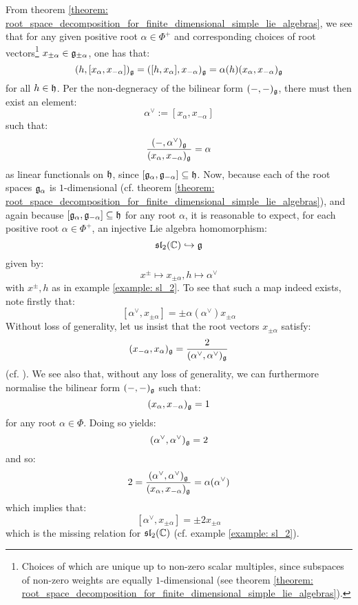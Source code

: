         From theorem \ref{theorem: root_space_decomposition_for_finite_dimensional_simple_lie_algebras}, we see that for any given positive root $\alpha \in \Phi^+$ and corresponding choices of root vectors\footnote{Choices of which are unique up to non-zero scalar multiples, since subspaces of non-zero weights are equally $1$-dimensional (see theorem \ref{theorem: root_space_decomposition_for_finite_dimensional_simple_lie_algebras}).} $x_{\pm\alpha} \in \mathfrak{g}_{\pm\alpha}$, one has that:
            $$(h, [x_{\alpha}, x_{-\alpha}])_{\mathfrak{g}} = ([h, x_{\alpha}], x_{-\alpha})_{\mathfrak{g}} = \alpha(h) (x_{\alpha}, x_{-\alpha})_{\mathfrak{g}}$$
        for all $h \in \mathfrak{h}$. Per the non-degneracy of the bilinear form $(-, -)_{\mathfrak{g}}$, there must then exist an element:
            $$\alpha^{\vee} := [x_{\alpha}, x_{-\alpha}]$$
        such that:
            $$\frac{(-, \alpha^{\vee})_{\mathfrak{g}}}{(x_{\alpha}, x_{-\alpha})_{\mathfrak{g}}} = \alpha$$
        as linear functionals on $\mathfrak{h}$, since $[\mathfrak{g}_{\alpha}, \mathfrak{g}_{-\alpha}] \subseteq \mathfrak{h}$. Now, because each of the root spaces $\mathfrak{g}_{\alpha}$ is $1$-dimensional (cf. theorem \ref{theorem: root_space_decomposition_for_finite_dimensional_simple_lie_algebras}), and again because $[\mathfrak{g}_{\alpha}, \mathfrak{g}_{-\alpha}] \subseteq \mathfrak{h}$ for any root $\alpha$, it is reasonable to expect, for each positive root $\alpha \in \Phi^+$, an injective Lie algebra homomorphism:
            $$\mathfrak{sl}_2(\mathbb{C}) \hookrightarrow \mathfrak{g}$$
        given by:
            $$x^{\pm} \mapsto x_{\pm \alpha}, h \mapsto \alpha^{\vee}$$
        with $x^{\pm}, h$ as in example \ref{example: sl_2}. To see that such a map indeed exists, note firstly that:
            $$[\alpha^{\vee}, x_{\pm \alpha}] = \pm \alpha(\alpha^{\vee}) x_{\pm \alpha}$$
        Without loss of generality, let us insist that the root vectors $x_{\pm \alpha}$ satisfy:
            $$(x_{-\alpha}, x_{\alpha})_{\mathfrak{g}} = \frac{2}{(\alpha^{\vee}, \alpha^{\vee})_{\mathfrak{g}}}$$
        (cf. \cite[Proposition 8.3]{humphreys_lie_algebras}). We see also that, without any loss of generality, we can furthermore normalise the bilinear form $(-, -)_{\mathfrak{g}}$ such that:
            $$(x_{\alpha}, x_{-\alpha})_{\mathfrak{g}} = 1$$
        for any root $\alpha \in \Phi$. Doing so yields:
            $$(\alpha^{\vee}, \alpha^{\vee})_{\mathfrak{g}} = 2$$
        and so:
            $$2 = \frac{(\alpha^{\vee}, \alpha^{\vee})_{\mathfrak{g}}}{(x_{\alpha}, x_{-\alpha})_{\mathfrak{g}}} = \alpha(\alpha^{\vee})$$
        which implies that:
            $$[\alpha^{\vee}, x_{\pm \alpha}] = \pm 2 x_{\pm \alpha}$$
        which is the missing relation for $\mathfrak{sl}_2(\mathbb{C})$ (cf. example \ref{example: sl_2}).
        
